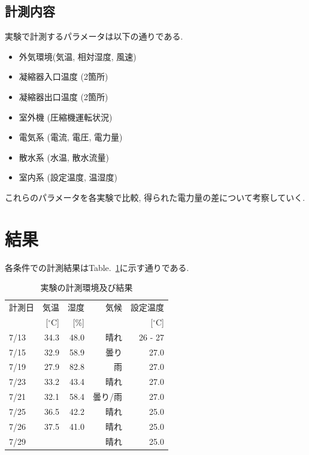\documentclass[a4j,fleqn,dvipdfmx,uplatex]{jsarticle}
\newcommand{\tableref}[1]{Table.\ \ref{#1}}
\begin{document}
\subsection{計測内容}
実験で計測するパラメータは以下の通りである. 

\begin{itemize}
  \item 外気環境(気温, 相対湿度, 風速)
  \item 凝縮器入口温度 (2箇所)
  \item 凝縮器出口温度 (2箇所)
  \item 室外機 (圧縮機運転状況)
  \item 電気系 (電流, 電圧, 電力量)
  \item 散水系 (水温, 散水流量)
  \item 室内系 (設定温度, 温湿度)
\end{itemize}

これらのパラメータを各実験で比較, 得られた電力量の差について考察していく. 

\section{結果}\label{sec3}
各条件での計測結果は\tableref{table:ex}に示す通りである. 

\begin{table}[htb]
  \caption{実験の計測環境及び結果}
  \label{table:ex}
  \centering
  \begin{tabular}{lrrrr}
    \small 計測日 & \small 気温 & \small 湿度 & \small 気候 & \small 設定温度 \\[-1.5mm]
     & \small [$^\circ$C] & \small [\%] & & \small [$^\circ$C] \\
    \hline \hline
    7/13 & 34.3 & 48.0 & 晴れ & 26 - 27 \\
    7/15 & 32.9 & 58.9 & 曇り & 27.0 \\
    7/19 & 27.9 & 82.8 & 雨 & 27.0 \\
    7/23 & 33.2 & 43.4 & 晴れ & 27.0 \\
    7/21 & 32.1 & 58.4 & 曇り/雨 & 27.0 \\[2.5mm]
    7/25 & 36.5 & 42.2 & 晴れ & 25.0 \\
    7/26 & 37.5 & 41.0 & 晴れ & 25.0 \\
    7/29 &  &  & 晴れ & 25.0 \\
    \hline
  \end{tabular}
\end{table}
\end{document}
